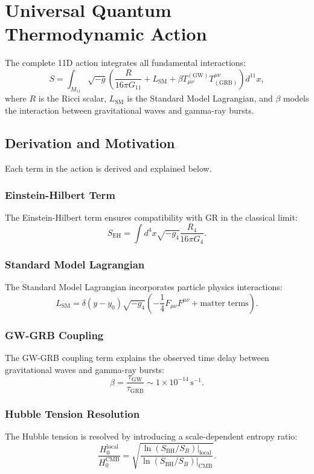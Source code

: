 \documentclass[12pt]{article}
\begin{document}
\section{Universal Quantum Thermodynamic Action}
The complete 11D action integrates all fundamental interactions:
\[
S = \int_{M_{11}} \sqrt{-g} \left( \frac{R}{16\pi G_{11}} + L_{\text{SM}} + \beta T_{\mu\nu}^{(\text{GW})} T^{\mu\nu}_{(\text{GRB})} \right) d^{11}x,
\]
where $R$ is the Ricci scalar, $L_{\text{SM}}$ is the Standard Model Lagrangian, and $\beta$ models the interaction between gravitational waves and gamma-ray bursts.

\subsection{Derivation and Motivation}
Each term in the action is derived and explained below.

\subsubsection{Einstein-Hilbert Term}
The Einstein-Hilbert term ensures compatibility with GR in the classical limit:
\[
S_{\text{EH}} = \int d^4x \sqrt{-g_4} \frac{R_4}{16\pi G_4}.
\]

\subsubsection{Standard Model Lagrangian}
The Standard Model Lagrangian incorporates particle physics interactions:
\[
L_{\text{SM}} = \delta(y - y_0) \sqrt{-g_4} \left(-\frac{1}{4} F_{\mu\nu} F^{\mu\nu} + \text{matter terms}\right).
\]

\subsubsection{GW-GRB Coupling}
The GW-GRB coupling term explains the observed time delay between gravitational waves and gamma-ray bursts:
\[
\beta = \frac{\tau_{\text{GW}}}{\tau_{\text{GRB}}} \sim 1 \times 10^{-14} \, \text{s}^{-1}.
\]

\subsubsection{Hubble Tension Resolution}
The Hubble tension is resolved by introducing a scale-dependent entropy ratio:
\[
\frac{H_0^{\text{local}}}{H_0^{\text{CMB}}} = \sqrt{\frac{\ln(S_{\text{BH}} / S_B)|_{\text{local}}}{\ln(S_{\text{BH}} / S_B)|_{\text{CMB}}}}.
\]
\end{document}
